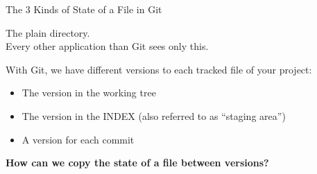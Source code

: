 \documentclass[8pt,utf8]{beamer}
\begin{document}
\begin{frame}{The 3 Kinds of State of a File in Git}
\begin{tikzpicture}[outer sep=1]
  \end{tikzpicture}

  \begin{minipage}[b][3cm][b]{1.0\textwidth}
   {
    The plain directory.\\
    Every other application than Git sees only this.}
   {
    With Git, we have different versions to each tracked file of your project:
    \begin{itemize}
      \item The version in the working tree
      \item The version in the INDEX (also referred to as ``staging area'')
      \item A version for each commit
    \end{itemize}


    \textbf{How can we copy the state of a file between versions?}
  }



  \end{minipage}
\end{frame}
\end{document}
